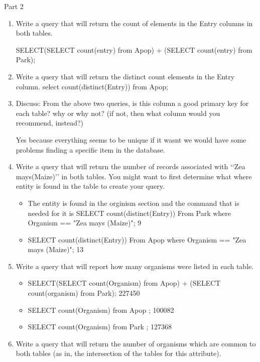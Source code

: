 \documentclass{report}
\begin{document}
Part 2
\begin{enumerate}




\item Write a query that will return the count of elements in the Entry columns in both tables.

SELECT(SELECT count(entry) from Apop) + (SELECT count(entry) from Park);

\item Write a query that will return the distinct count elements in the Entry column.
select count(distinct(Entry)) from Apop;
\item Discuss: From the above two queries, is this column a good primary key for each table? why or
why not? (if not, then what column would you recommend, instead?)

Yes because everything seems to be unique if it wasnt we would have some problems finding a specific item in the database. 

\item Write a query that will return the number of records associated with ‘‘Zea mays(Maize)’’ in
both tables. You might want to first determine what where entity is found in the table to create
your query.
\begin{itemize}
\item The entity is found in the orginism section and the command that is needed for it  is SELECT count(distinct(Entry)) From Park where Organism == "Zea mays (Maize)";
9
\item SELECT count(distinct(Entry)) From Apop where Organism == "Zea mays (Maize)";
13
\end{itemize}









\item Write a query that will report how many organisms were listed in each table.

\begin{itemize}

\item SELECT(SELECT count(Organism) from Apop) + (SELECT count(organism) from Park);
227450
\item  SELECT count(Organism) from Apop ;
100082
\item  SELECT count(Organism) from Park ;
127368

\end{itemize}
 \item  Write a query that will return the number of organisms which are common to both
tables (as in, the intersection of the tables for this attribute).


\end{enumerate}
\end{document}
